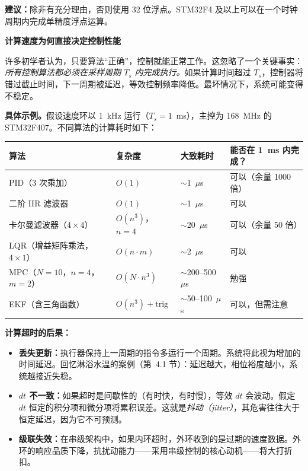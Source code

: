 \textbf{建议：}除非有充分理由，否则使用 32 位浮点。STM32F4 及以上可以在一个时钟周期内完成单精度浮点运算。

\vspace{0.5em}
\begin{mdframed}[linewidth=1pt, innertopmargin=10pt, innerbottommargin=10pt]
\textbf{计算速度为何直接决定控制性能}

\vspace{0.3em}
许多初学者认为，只要算法``正确''，控制就能正常工作。这忽略了一个关键事实：\textit{所有控制算法都必须在采样周期 $T_s$ 内完成执行。}如果计算时间超过 $T_s$，控制器将错过截止时间，下一周期被延迟，等效控制频率降低。最坏情况下，系统可能变得不稳定。

\textbf{具体示例。}假设速度环以 1~kHz 运行（$T_s = 1$~ms），主控为 168~MHz 的 STM32F407。不同算法的计算耗时如下：

\begin{center}
\begin{tabular}{llll}
\toprule
\textbf{算法} & \textbf{复杂度} & \textbf{大致耗时} & \textbf{能否在 1~ms 内完成？} \\
\midrule
PID（3 次乘加） & $O(1)$ & $\sim$1~$\mu$s & 可以（余量 1000 倍） \\
二阶 IIR 滤波器 & $O(1)$ & $\sim$1~$\mu$s & 可以 \\
卡尔曼滤波器（$4 \times 4$） & $O(n^3)$，$n=4$ & $\sim$20~$\mu$s & 可以（余量 50 倍） \\
LQR（增益矩阵乘法，$4 \times 1$） & $O(n \cdot m)$ & $\sim$2~$\mu$s & 可以 \\
MPC（$N=10$，$n=4$，$m=2$） & $O(N \cdot n^3)$ & $\sim$200--500~$\mu$s & 勉强 \\
EKF（含三角函数） & $O(n^3) + \text{trig}$ & $\sim$50--100~$\mu$s & 可以，但需注意 \\
\bottomrule
\end{tabular}
\end{center}

\textbf{计算超时的后果：}
\begin{itemize}[nosep]
    \item \textbf{丢失更新：}执行器保持上一周期的指令多运行一个周期。系统将此视为增加的时间延迟。回忆淋浴水温的案例（第~4.1 节）：延迟越大，相位裕度越小，系统越接近失稳。
    \item \textbf{$dt$ 不一致：}如果超时是间歇性的（有时快，有时慢），等效 $dt$ 会波动。假定 $dt$ 恒定的积分项和微分项将累积误差。这就是\textit{抖动（jitter）}，其危害往往大于恒定延迟，因为它不可预测。
    \item \textbf{级联失效：}在串级架构中，如果内环超时，外环收到的是过期的速度数据。外环的响应品质下降，抗扰动能力——采用串级控制的核心动机——将大打折扣。
\end{itemize}


\end{mdframed}
